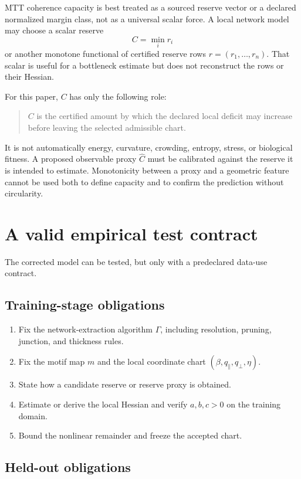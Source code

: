 \documentclass[11pt]{article}
\begin{document}
MTT coherence capacity is best treated as a sourced reserve vector or a
declared normalized margin class, not as a universal scalar force.  A local
network model may choose a scalar reserve
\[
  C=\min_i r_i
\]
or another monotone functional of certified reserve rows
$r=(r_1,\ldots,r_n)$.  That scalar is useful for a bottleneck estimate but
does not reconstruct the rows or their Hessian.

For this paper, $C$ has only the following role:

\begin{quote}
$C$ is the certified amount by which the declared local deficit may increase
before leaving the selected admissible chart.
\end{quote}

It is not automatically energy, curvature, crowding, entropy, stress, or
biological fitness.  A proposed observable proxy $\widehat C$ must be
calibrated against the reserve it is intended to estimate.  Monotonicity
between a proxy and a geometric feature cannot be used both to define
capacity and to confirm the prediction without circularity.

\section{A valid empirical test contract}

The corrected model can be tested, but only with a predeclared data-use
contract.

\subsection{Training-stage obligations}

\begin{enumerate}
\item Fix the network-extraction algorithm $\Gamma$, including resolution,
pruning, junction, and thickness rules.
\item Fix the motif map $m$ and the local coordinate chart
$(\beta,q_\parallel,q_\perp,\eta)$.
\item State how a candidate reserve or reserve proxy is obtained.
\item Estimate or derive the local Hessian and verify $a,b,c>0$ on the
training domain.
\item Bound the nonlinear remainder and freeze the accepted chart.
\end{enumerate}

\subsection{Held-out obligations}
\end{document}
